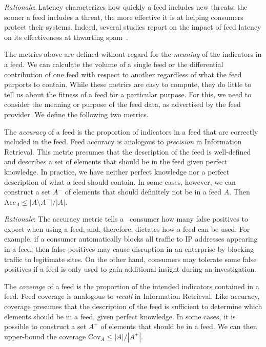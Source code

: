 \emph{Rationale}: Latency characterizes how quickly a feed includes new
threats: the sooner a feed includes a threat, the more effective it is at
helping consumers protect their systems. Indeed, several studies report on the
impact of feed latency on its effectiveness at
thwarting spam~\cite{blacklisting:weis14,ramachandran2007filtering}.

The metrics above are defined without regard for the \emph{meaning} of the
indicators in a feed. We can calculate the volume of a single feed or the
differential contribution of one feed with respect to another regardless of
what the feed purports to contain. While these metrics are easy to compute,
they do little to tell us about the fitness of a feed for a particular purpose.
For this, we need to consider the meaning or purpose of the feed data, as
advertised by the feed provider. We define the following two metrics.



\metrics {} The \emph{accuracy} of a feed is the proportion of
indicators in a feed that are correctly included in the feed. Feed accuracy is
analogous to \emph{precision} in Information Retrieval. This metric presumes
that the description of the feed is well-defined and describes a set of elements
that should be in the feed given perfect knowledge. In practice, we have neither
perfect knowledge nor a perfect description of what a feed should contain. In
some cases, however, we can construct a set $A^-$ of elements that should
definitely not be in a feed $A$. Then $\mathrm{Acc}_A \le |A\setminus A^-|/|A|$.

\emph{Rationale}: The accuracy metric tells a \ti\ consumer how many false
positives to expect when using a feed, and, therefore, dictates how a feed
can be used. For example, if a consumer automatically blocks all traffic to
IP addresses appearing in a feed, then false positives may cause disruption
in an enterprise by blocking traffic to legitimate sites. On the other hand,
consumers may tolerate some false positives if a feed is only used to
gain additional insight during an investigation.

\metrics {} The \emph{coverage} of a feed is the proportion
of the intended indicators contained in a feed. Feed coverage is analogous
to \emph{recall} in Information Retrieval. Like accuracy, coverage presumes
that the description of the feed is sufficient to determine which elements
should be in a feed, given perfect knowledge. In some cases, it is possible
to construct a set $A^+$ of elements that should be in a feed. We can then
upper-bound the coverage $\mathrm{Cov}_A \le |A|/|A^+|$.


